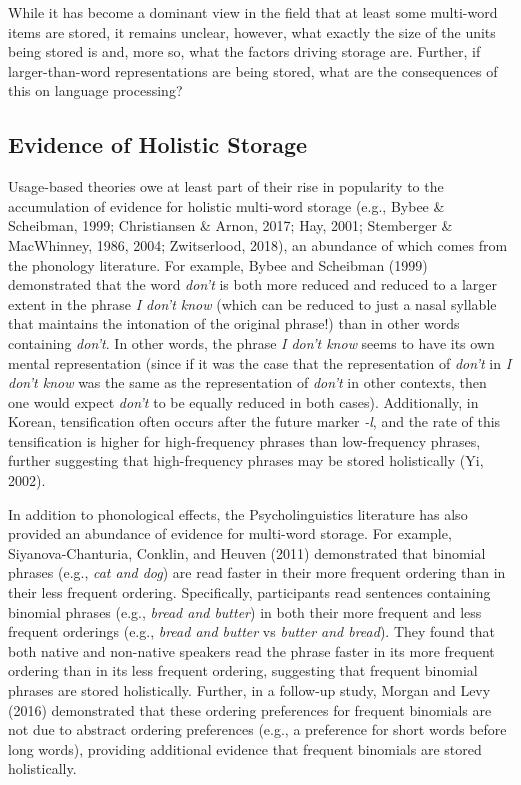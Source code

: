 \documentclass[
  man,floatsintext]{apa6}
\begin{document}
While it has become a dominant view in the field that at least some multi-word items are stored, it remains unclear, however, what exactly the size of the units being stored is and, more so, what the factors driving storage are. Further, if larger-than-word representations are being stored, what are the consequences of this on language processing?

\subsection{Evidence of Holistic Storage}\label{evidence-of-holistic-storage}

Usage-based theories owe at least part of their rise in popularity to the accumulation of evidence for holistic multi-word storage (e.g., Bybee \& Scheibman, 1999; Christiansen \& Arnon, 2017; Hay, 2001; Stemberger \& MacWhinney, 1986, 2004; Zwitserlood, 2018), an abundance of which comes from the phonology literature. For example, Bybee and Scheibman (1999) demonstrated that the word \emph{don't} is both more reduced and reduced to a larger extent in the phrase \emph{I don't know} (which can be reduced to just a nasal syllable that maintains the intonation of the original phrase!) than in other words containing \emph{don't}. In other words, the phrase \emph{I don't know} seems to have its own mental representation (since if it was the case that the representation of \emph{don't} in \emph{I don't know} was the same as the representation of \emph{don't} in other contexts, then one would expect \emph{don't} to be equally reduced in both cases). Additionally, in Korean, tensification often occurs after the future marker \emph{-l}, and the rate of this tensification is higher for high-frequency phrases than low-frequency phrases, further suggesting that high-frequency phrases may be stored holistically (Yi, 2002).

In addition to phonological effects, the Psycholinguistics literature has also provided an abundance of evidence for multi-word storage. For example, Siyanova-Chanturia, Conklin, and Heuven (2011) demonstrated that binomial phrases (e.g., \emph{cat and dog}) are read faster in their more frequent ordering than in their less frequent ordering. Specifically, participants read sentences containing binomial phrases (e.g., \emph{bread and butter}) in both their more frequent and less frequent orderings (e.g., \emph{bread and butter} vs \emph{butter and bread}). They found that both native and non-native speakers read the phrase faster in its more frequent ordering than in its less frequent ordering, suggesting that frequent binomial phrases are stored holistically. Further, in a follow-up study, Morgan and Levy (2016) demonstrated that these ordering preferences for frequent binomials are not due to abstract ordering preferences (e.g., a preference for short words before long words), providing additional evidence that frequent binomials are stored holistically.
\end{document}
